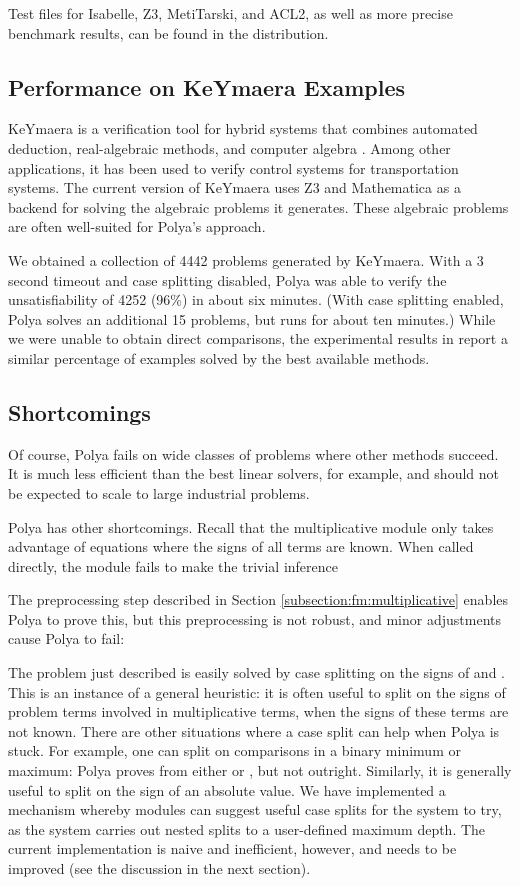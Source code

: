 \documentclass[runningheds]{llncs}
\begin{document}
Test files for Isabelle, Z3, MetiTarski, and ACL2, as well as more precise benchmark results, can be found in the distribution.

\subsection{Performance on KeYmaera Examples}
\label{subsection:keymaerea}

KeYmaera is a verification tool for hybrid systems that combines automated deduction, real-algebraic methods, and computer algebra \cite{platzer:08} \cite{platzer:09}. Among other applications, it has been used to verify control systems for transportation systems. The current version of KeYmaera uses Z3 and Mathematica as a backend for solving the algebraic problems it generates. These algebraic problems are often well-suited for Polya's approach. 

We obtained a collection of 4442 problems generated by KeYmaera. With a 3 second timeout and case splitting disabled, Polya was able to verify the unsatisfiability of 4252 (96\%) in about six minutes. (With case splitting enabled, Polya solves an additional 15 problems, but runs for about ten minutes.) While we were unable to obtain direct comparisons, the experimental results in \cite{platzer:09} report a similar percentage of examples solved by the best available methods.

\subsection{Shortcomings}
\label{subsection:shortcomings}

Of course, Polya fails on wide classes of problems where other methods succeed. It is much less efficient than the best linear solvers, for example, and should not be expected to scale to large industrial problems. 

Polya has other shortcomings. Recall that the multiplicative module only takes advantage of equations where the signs of all terms are known. When called directly, the module fails to make the trivial inference

The preprocessing step described in Section \ref{subsection:fm:multiplicative} enables Polya to prove this, but this preprocessing is not robust, and minor adjustments cause Polya to fail:


The problem just described is easily solved by case splitting on the signs of  and . This is an instance of a general heuristic: it is often useful to split on the signs of problem terms involved in multiplicative terms, when the signs of these terms are not known. There are other situations where a case split can help when Polya is stuck. For example, one can split on comparisons in a binary minimum or maximum: Polya proves  from either  or , but not outright. Similarly, it is generally useful to split on the sign of an absolute value. We have implemented a mechanism whereby modules can suggest useful case splits for the system to try, as the system carries out nested splits to a user-defined maximum depth. The current implementation is naive and inefficient, however, and needs to be improved (see the discussion in the next section).
\end{document}
